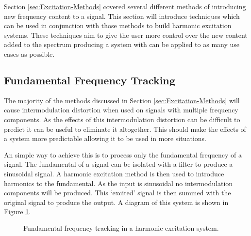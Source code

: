 	Section \ref{sec:Excitation-Methods} covered several different methods of introducing new frequency content to a
	signal. This section will introduce techniques which can be used in conjunction with those methods to build
	harmonic excitation systems. These techniques aim to give the user more control over the new content added to the
	spectrum producing a system with can be applied to as many use cases as possible.

	\subsection{Fundamental Frequency Tracking}
	\label{sec:FeatureControl-Fundamental}
		The majority of the methods discussed in Section \ref{sec:Excitation-Methods} will cause intermodulation
		distortion when used on signals with multiple frequency components. As the effects of this intermodulation
		distortion can be difficult to predict it can be useful to eliminate it altogether. This should make the
		effects of a system more predictable allowing it to be used in more situations.

		An simple way to achieve this is to process only the fundamental frequency of a signal. The fundamental of
		a signal can be isolated with a filter to produce a sinusoidal signal. A harmonic excitation method is then
		used to introduce harmonics to the fundamental. As the input is sinusoidal no intermodulation components
		will be produced. This `excited' signal is then summed with the original signal to produce the output. A
		diagram of this system is shown in Figure \ref{fig:F0Tracking}.

		\begin{figure}[h!]
			\centering
			\caption{Fundamental frequency tracking in a harmonic excitation system.}
			\label{fig:F0Tracking}
		\end{figure}


